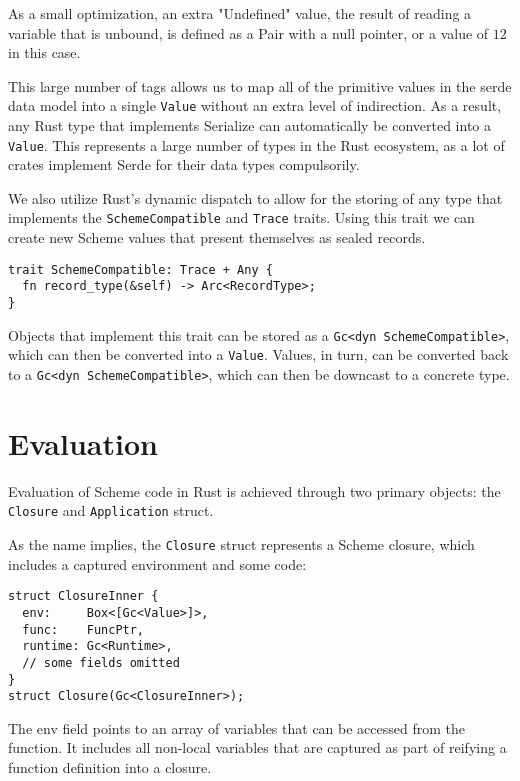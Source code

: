 \documentclass[sigplan]{acmart}
\begin{document}
As a small optimization, an extra "Undefined" value, the result of reading a
variable that is unbound, is defined as a Pair with a null pointer, or a value
of $12$ in this case.

This large number of tags allows us to map all of the primitive values in the
serde data model \cite{serde} into a single \texttt{Value} without an extra level of
indirection. As a result, any Rust type that implements Serialize can
automatically be converted into a \texttt{Value}. This represents a large number of
types in the Rust ecosystem, as a lot of crates implement Serde for their data types
compulsorily.

We also utilize Rust's dynamic dispatch to allow for the storing of any type that
implements the \texttt{SchemeCompatible} and \texttt{Trace} traits. Using this
trait we can create new Scheme values that present themselves as sealed records.

\begin{verbatim}
trait SchemeCompatible: Trace + Any {
  fn record_type(&self) -> Arc<RecordType>;
}
\end{verbatim}

Objects that implement this trait can be stored as a \texttt{Gc<dyn SchemeCompatible>},
which can then be converted into a \texttt{Value}. Values, in turn, can be converted
back to a \texttt{Gc<dyn SchemeCompatible>}, which can then be downcast to a concrete
type.

\section{Evaluation}

Evaluation of Scheme code in Rust is achieved through two primary objects: the
\texttt{Closure} and \texttt{Application} struct.

As the name implies, the \texttt{Closure} struct represents a Scheme closure,
which includes a captured environment and some code:

\begin{verbatim}
struct ClosureInner {
  env:     Box<[Gc<Value>]>,
  func:    FuncPtr,
  runtime: Gc<Runtime>,
  // some fields omitted
}
struct Closure(Gc<ClosureInner>);
\end{verbatim}

The env field points to an array of variables that can be accessed from the
function. It includes all non-local variables that are captured as part of
reifying a function definition into a closure.
\end{document}
